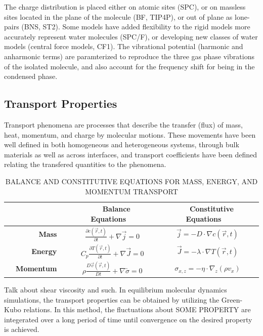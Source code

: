 

The charge distribution is placed either on atomic sites (SPC), or on
massless sites located in the plane of the molecule (BF, TIP4P), or
out of plane as lone-pairs (BNS, ST2). Some models have added
flexibility to the rigid models more accurately represent water
molecules (SPC/F), or developing new classes of water models (central
force models, CF1). The vibrational potential (harmonic and anharmonic
terms) are paramterized to reproduce the three gas phase vibrations of
the isolated molecule, and also account for the frequency shift for
being in the condensed phase. 


 


\subsection{Transport Properties}
Transport phenomena are processes that describe the transfer (flux) of
mass, heat, momentum, and charge by molecular motions. These movements
have been well defined in both homogeneous and heterogeneous systems,
through bulk materials as well as across interfaces, and transport
coefficients have been defined relating the transfered quantities to
the phenomena.


\begin{longtable}{rcc}
	\caption{BALANCE AND CONSTITUTIVE EQUATIONS FOR MASS, ENERGY, AND MOMENTUM TRANSPORT}
	\label{tab:transport}
	\\\hline \hline
 	& \textbf{~~Balance Equations~~} & \textbf{~~Constitutive Equations~~}\\ \hline 
	\textbf{~~Mass~~} & $\frac{\partial c (\vec{r}, t)}{\partial t} + \nabla \vec{j} = 0$ & $\vec{j} = -D \cdot \nabla c(\vec{r}, t)$\\
	\textbf{~~Energy~~} & $C_p \frac{\partial T (\vec{r}, t)}{\partial t} + \nabla \vec{J} = 0$ & $\vec{J} = -\lambda \cdot \nabla T(\vec{r}, t)$\\
	\textbf{~~Momentum~~} & $\rho \frac{D \vec{v}(\vec{r}, t)}{Dt} + \nabla \overleftrightarrow{\sigma} = 0$ & $\sigma_{x,z} = -\eta \cdot \nabla_z (\rho v_x)$\\ \hline \hline
\end{longtable}





Talk about shear viscosity and such.  In equilibrium molecular
dynamics simulations, the transport properties can be obtained by
utilizing the Green-Kubo relations. In this method, the fluctuations
about SOME PROPERTY are integerated over a long period of time until
convergence on the desired property is achieved. 

